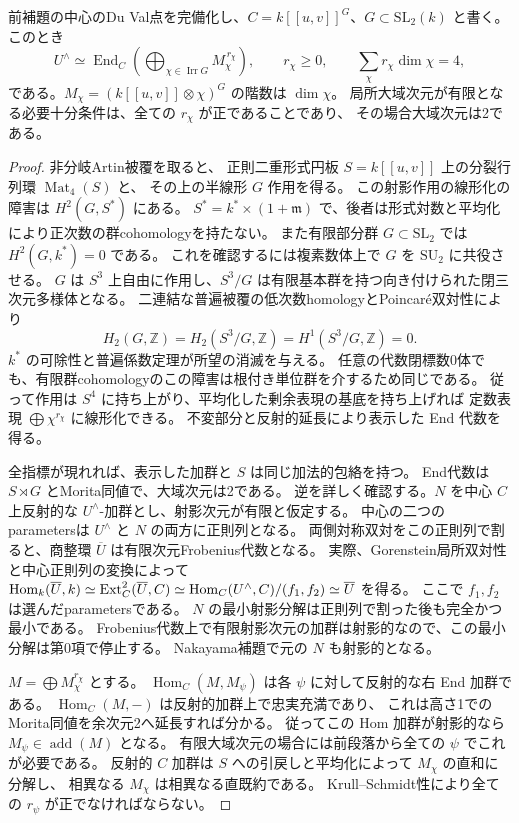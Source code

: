 \begin{lemma}[Du Val中心上の非分岐整環の指標表示]
\label{lem:order4-duval-multiplicities}
前補題の中心のDu Val点を完備化し、$C=k[[u,v]]^G$、$G\subset\mathrm{SL}_2(k)$ と書く。
このとき
\[
 U^{\wedge}\simeq\operatorname{End}_C\left(\bigoplus_{\chi\in\operatorname{Irr}G}M_\chi^{\,r_\chi}\right),
 \qquad r_\chi\ge0,\qquad \sum_\chi r_\chi\dim\chi=4,
\]
である。$M_\chi=(k[[u,v]]\otimes\chi)^G$ の階数は $\dim\chi$。
局所大域次元が有限となる必要十分条件は、全ての $r_\chi$ が正であることであり、
その場合大域次元は2である。
\end{lemma}
\begin{proof}
非分岐Artin被覆\cite[Theorem 3.1]{CHIOrders}を取ると、
正則二重形式円板 $S=k[[u,v]]$ 上の分裂行列環 $\operatorname{Mat}_4(S)$ と、
その上の半線形 $G$ 作用を得る。
この射影作用の線形化の障害は $H^2(G,S^*)$ にある。
$S^*=k^*\times(1+\mathfrak m)$ で、後者は形式対数と平均化により正次数の群cohomologyを持たない。
また有限部分群 $G\subset\mathrm{SL}_2$ では $H^2(G,k^*)=0$ である。
これを確認するには複素数体上で $G$ を $\mathrm{SU}_2$ に共役させる。
$G$ は $S^3$ 上自由に作用し、$S^3/G$ は有限基本群を持つ向き付けられた閉三次元多様体となる。
二連結な普遍被覆の低次数homologyとPoincar\'e双対性により
\[
 H_2(G,\mathbb Z)=H_2(S^3/G,\mathbb Z)
 =H^1(S^3/G,\mathbb Z)=0.
\]
$k^*$ の可除性と普遍係数定理が所望の消滅を与える。
任意の代数閉標数0体でも、有限群cohomologyのこの障害は根付き単位群を介するため同じである。
従って作用は $S^4$ に持ち上がり、平均化した剰余表現の基底を持ち上げれば
定数表現 $\bigoplus\chi^{r_\chi}$ に線形化できる。
不変部分と反射的延長により表示した End 代数を得る。

全指標が現れれば、表示した加群と $S$ は同じ加法的包絡を持つ。
End代数は $S\rtimes G$ とMorita同値で、大域次元は2である。
逆を詳しく確認する。$N$ を中心 $C$ 上反射的な $U^{\wedge}$-加群とし、射影次元が有限と仮定する。
中心の二つのparametersは $U^{\wedge}$ と $N$ の両方に正則列となる。
両側対称双対をこの正則列で割ると、商整環 $\overline U$ は有限次元Frobenius代数となる。
実際、Gorenstein局所双対性と中心正則列の変換によって
$\operatorname{Hom}_k(\overline U,k)\simeq\operatorname{Ext}_C^2(\overline U,C)\simeq
\operatorname{Hom}_C(U^{\wedge},C)/(f_1,f_2)\simeq\overline U$ を得る。
ここで $f_1,f_2$ は選んだparametersである。
$N$ の最小射影分解は正則列で割った後も完全かつ最小である。
Frobenius代数上で有限射影次元の加群は射影的なので、この最小分解は第0項で停止する。
Nakayama補題で元の $N$ も射影的となる。

$M=\bigoplus M_\chi^{r_\chi}$ とする。
$\operatorname{Hom}_C(M,M_\psi)$ は各 $\psi$ に対して反射的な右 End 加群である。
$\operatorname{Hom}_C(M,-)$ は反射的加群上で忠実充満であり、
これは高さ1でのMorita同値を余次元2へ延長すれば分かる。
従ってこの Hom 加群が射影的なら $M_\psi\in\operatorname{add}(M)$ となる。
有限大域次元の場合には前段落から全ての $\psi$ でこれが必要である。
反射的 $C$ 加群は $S$ への引戻しと平均化によって $M_\chi$ の直和に分解し、
相異なる $M_\chi$ は相異なる直既約である。
Krull--Schmidt性により全ての $r_\psi$ が正でなければならない。
\end{proof}

